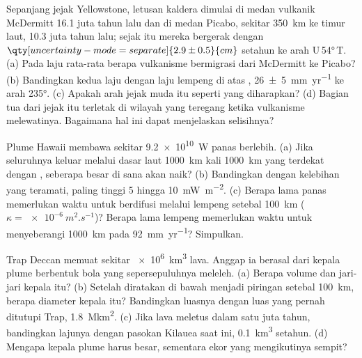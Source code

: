 \begin{exercise}[$\star\star$]\label{exo:b1:hotspots:8}
Sepanjang jejak Yellowstone, letusan kaldera dimulai di medan vulkanik McDermitt 16.1 juta tahun lalu dan di medan Picabo, sekitar \qty{350}{km} ke timur laut, 10.3 juta tahun lalu; sejak itu mereka bergerak dengan $\qty[uncertainty-mode=separate]{2.9 \pm 0.5}{cm}$ setahun ke arah U\,\ang{54}\,T. (a) Pada laju rata-rata berapa vulkanisme bermigrasi dari McDermitt ke Picabo? (b) Bandingkan kedua laju dengan laju lempeng di atas , \qty[uncertainty-mode=separate]{26 \pm 5}{mm.yr^{-1}} ke arah \ang{235}. (c) Apakah arah jejak muda itu seperti yang diharapkan? (d) Bagian tua dari jejak itu terletak di wilayah yang teregang ketika vulkanisme melewatinya. Bagaimana hal ini dapat menjelaskan selisihnya?
\end{exercise}

\begin{exercise}[$\star\star$]\label{exo:b1:hotspots:9}
Plume Hawaii membawa sekitar \qty{9.2e10}{W} panas berlebih. (a) Jika seluruhnya keluar melalui dasar laut \qty{1000}{km} kali \qty{1000}{km} yang terdekat dengan , seberapa besar  di sana akan naik? (b) Bandingkan dengan kelebihan yang teramati, paling tinggi 5 hingga \qty{10}{mW.m^{-2}}. (c) Berapa lama panas memerlukan waktu untuk berdifusi melalui lempeng setebal \qty{100}{km} ($\kappa = \qty{e-6}{m^2.s^{-1}}$)? Berapa lama lempeng memerlukan waktu untuk menyeberangi \qty{1000}{km} pada \qty{92}{mm.yr^{-1}}? Simpulkan.
\end{exercise}

\begin{exercise}[$\star\star\star$]\label{exo:b1:hotspots:10}
Trap Deccan memuat sekitar \qty{e6}{km^3} lava. Anggap ia berasal dari kepala plume berbentuk bola yang sepersepuluhnya meleleh. (a) Berapa volume dan jari-jari kepala itu? (b) Setelah diratakan di bawah  menjadi piringan setebal \qty{100}{km}, berapa diameter kepala itu? Bandingkan luasnya dengan luas yang pernah ditutupi Trap, \qty{1.8}{\mega km^2}. (c) Jika lava meletus dalam satu juta tahun, bandingkan lajunya dengan pasokan Kilauea saat ini, \qty{0.1}{km^3} setahun. (d) Mengapa kepala plume harus besar, sementara ekor yang mengikutinya sempit?
\end{exercise}

